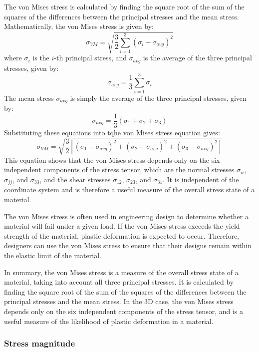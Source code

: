 The von Mises stress is calculated by finding the square root of the sum of the squares of the differences between the principal stresses and the mean stress. Mathematically, the von Mises stress is given by:
\begin{equation}
    \sigma_{VM} = \sqrt{\frac{3}{2}\sum_{i=1}^{3}(\sigma_i-\sigma_{avg})^2}
\end{equation}
where $\sigma_i$ is the $i$-th principal stress, and $\sigma_{avg}$ is the average of the three principal stresses, given by:
\begin{equation}
    \sigma_{avg} = \frac{1}{3}\sum_{i=1}^{3}\sigma_i
\end{equation}
The mean stress $\sigma_{avg}$ is simply the average of the three principal stresses, given by:
\begin{equation}
    \sigma_{avg} = \frac{1}{3}(\sigma_1 + \sigma_2 + \sigma_3)
\end{equation}
Substituting these equations into tqhe von Mises stress equation gives:
\begin{equation}
    \sigma_{VM} = \sqrt{\frac{3}{2}\left[(\sigma_1-\sigma_{avg})^2 + (\sigma_2-\sigma_{avg})^2 + (\sigma_3-\sigma_{avg})^2\right]}
\end{equation}
This equation shows that the von Mises stress depends only on the six independent components of the stress tensor, which are the normal stresses $\sigma_{ii}$, $\sigma_{jj}$, and $\sigma_{33}$, and the shear stresses $\sigma_{12}$, $\sigma_{23}$, and $\sigma_{31}$. It is independent of the coordinate system and is therefore a useful measure of the overall stress state of a material.

The von Mises stress is often used in engineering design to determine whether a material will fail under a given load. If the von Mises stress exceeds the yield strength of the material, plastic deformation is expected to occur. Therefore, designers can use the von Mises stress to ensure that their designs remain within the elastic limit of the material.

In summary, the von Mises stress is a measure of the overall stress state of a material, taking into account all three principal stresses. It is calculated by finding the square root of the sum of the squares of the differences between the principal stresses and the mean stress. In the 3D case, the von Mises stress depends only on the six independent components of the stress tensor, and is a useful measure of the likelihood of plastic deformation in a material.
\subsubsection{Stress magnitude}
